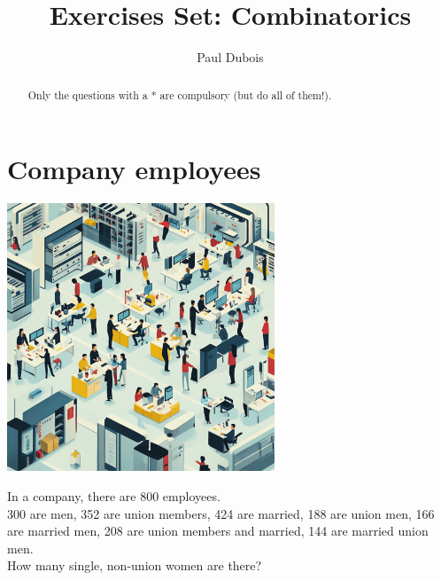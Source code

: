 \documentclass[]{article}
\title{Exercises Set: Combinatorics}
\author{Paul Dubois}
\date{}
\begin{document}
	
	\maketitle
	
	\begin{abstract}
		Only the questions with a * are compulsory (but do all of them!).
	\end{abstract}
	
	\section{Company employees}
	\begin{center}
		\includegraphics[height=8cm]{company.png}
	\end{center}
	In a company, there are 800 employees.\\
	300 are men, 352 are union members, 424 are married, 188 are union men, 166 are married men, 208 are union members and married, 144 are married union men.\\
	How many single, non-union women are there?
	
	\newpage
\end{document}
